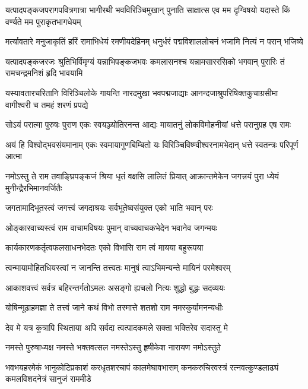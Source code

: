 \fourlineindentedshloka
{यत्पादपङ्कजपरागपवित्रगात्रा}
{भागीरथी भवविरिञ्चिमुखान् पुनाति}
{साक्षात्स एव मम दृग्विषयो यदास्ते}
{किं वर्ण्यते मम पुराकृतभागधेयम्} %

\fourlineindentedshloka
{मर्त्यावतारे मनुजाकृतिं हरिं}
{रामाभिधेयं रमणीयदेहिनम्}
{धनुर्धरं पद्मविशाललोचनं}
{भजामि नित्यं न परान् भजिष्ये} %

\fourlineindentedshloka
{यत्पादपङ्कजरजः श्रुतिभिर्विमृग्यं}
{यन्नाभिपङ्कजभवः कमलासनश्च}
{यन्नामसाररसिको भगवान् पुरारिः}
{तं रामचन्द्रमनिशं हृदि भावयामि} %

\fourlineindentedshloka
{यस्यावतारचरितानि विरिञ्चिलोके}
{गायन्ति नारदमुखा भवपद्मजाद्याः}
{आनन्दजाश्रुपरिषिक्तकुचाग्रसीमा}
{वागीश्वरी च तमहं शरणं प्रपद्ये} %

\fourlineindentedshloka
{सोऽयं परात्मा पुरुषः पुराण}
{एकः स्वयञ्ज्योतिरनन्त आद्यः}
{मायातनुं लोकविमोहनीयां}
{धत्ते परानुग्रह एष रामः} %

\fourlineindentedshloka
{अयं हि विश्वोद्भवसंयमानाम्}
{एकः स्वमायागुणबिम्बितो यः}
{विरिञ्चिविष्ण्वीश्वरनामभेदान्}
{धत्ते स्वतन्त्रः परिपूर्ण आत्मा} %

\fourlineindentedshloka
{नमोऽस्तु ते राम तवाङ्घ्रिपङ्कजं}
{श्रिया धृतं वक्षसि लालितं प्रियात्}
{आक्रान्तमेकेन जगत्त्रयं पुरा}
{ध्येयं मुनीन्द्रैरभिमानवर्जितैः} %

\twolineshloka
{जगतामादिभूतस्त्वं जगत्त्वं जगदाश्रयः}
{सर्वभूतेष्वसंयुक्त एको भाति भवान् परः} %

\twolineshloka
{ओङ्कारवाच्यस्त्वं राम वाचामविषयः पुमान्}
{वाच्यवाचकभेदेन भवानेव जगन्मयः} %

\twolineshloka
{कार्यकारणकर्तृत्वफलसाधनभेदतः}
{एको विभासि राम त्वं मायया बहुरूपया} %

\twolineshloka
{त्वन्मायामोहितधियस्त्वां न जानन्ति तत्त्वतः}
{मानुषं त्वाऽभिमन्यन्ते मायिनं परमेश्वरम्} %

\twolineshloka
{आकाशवत्त्वं सर्वत्र बहिरन्तर्गतोऽमलः}
{असङ्गो ह्यचलो नित्यः शुद्धो बुद्धः सदव्ययः} %

\twolineshloka
{योषिन्मूढाहमज्ञा ते तत्त्वं जाने कथं विभो}
{तस्मात्ते शतशो राम नमस्कुर्यामनन्यधीः} %

\twolineshloka
{देव मे यत्र कुत्रापि स्थिताया अपि सर्वदा}
{त्वत्पादकमले सक्ता भक्तिरेव सदास्तु मे} %

\twolineshloka
{नमस्ते पुरुषाध्यक्ष नमस्ते भक्तवत्सल}
{नमस्तेऽस्तु हृषीकेश नारायण नमोऽस्तुते} %

\fourlineindentedshloka
{भवभयहरमेकं भानुकोटिप्रकाशं}
{करधृतशरचापं कालमेघावभासम्}
{कनकरुचिरवस्त्रं रत्नवत्कुण्डलाढ्यं}
{कमलविशदनेत्रं सानुजं राममीडे} %


